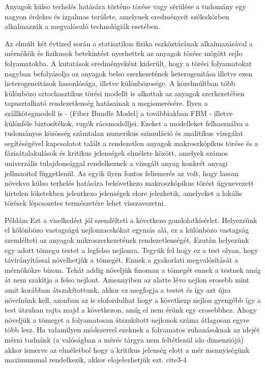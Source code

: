 Anyagok külso terhelés hatására történo törése vagy sérülése a tudomány egy nagyon érdekes és izgalmas
területe, amelynek eredményeit széleskörben alkalmazzák a megvalósuló technológiák esetében.

Az elmúlt két évtized során a statisztikus fizika eszköztárának alkalmazásával a mérnökök és fizikusok
betekintést nyerhettek az anyagok törése mögött rejlo folyamatokba. A kutatások eredményeként kiderült,
hogy a törési folyamatokat nagyban befolyásolja az anyagok belso szerkezetének heterogenitása illetve
ezen heterogeneitások hasonlósága, illetve különbözosége.
A közelmúltban több különbözo sztochasztikus törési modellt is alkottak az anyagok szerkezetében tapasztalható
rendezetlenség hatásainak a megismerésére. Ilyen a szállkötegmodell is - (Fiber Bundle Model) a továbbiakban FBM -
illetve különféle biztosítékok, rugók rácsmodelljei.
Ezeket a modelleket felhasználva a tudományos közösség számtalan numerikus szimuláció és analitikus
vizsgálat segítéségével kapcsolatot talált a rendezetlen anyagok makroszkópikus törése és a fázisátalakulások
és kritikus jelenségek elmélete között, amelyek számos univerzális tulajdonsággal rendelkeznek a vizsgált
anyag konkrét anyagi jellmzoitol függetlenül. Az egyik ilyen fontos felismerés az volt, hogy lassan növekvo
külso terhelés hatására bekövetkezo makroszkópikus törést úgynevezett hirtelen löketekben jelentkezo jelenségek
elore jelezhetik, amelyeket a lokális törések lépcsozetes természetére lehet visszavezetni. 

Példám
Ezt a viselkedést
jól szemlélteti a következo gondolatkísérlet. Helyezzünk el kölönbözo vastagságú nejlonzacskókat egymás
alá, ez a különbözo vastagság szemlélteti az anyagok mikroszerkezetének rendezetlenségét. Ezután helyezünk egy adott
tömegu testet a legfelso nejlonra. Tegyük fel hogy ez a test olyan, hogy távirányítással növelhetjük a tömegét.
Ennek a gyakorlati megvalósítását a mérnökökre bízom. Tehát addig növeljük finoman a tömegét ennek a testnek amíg át nem 
szakítja a felso nejlont. Amennyiben az alatte lévo nejlon erosebb mint amit korábban átszakítottunk, akkor ez megfogja
a testet és így azt újra növelnünk kell, azonban az is elofordulhat hogy a következp nejlon gyengébb így a test átzuhan rajta
majd a következon, amíg el nem érünk egy erosebbhez. Ahogy növeljük a tömeget a folyamatosan átszakított nejlonok száma
átlagosan egyre több lesz. Ha valamilyen módszerrel ezeknek a folyamatos zuhanásoknak az idejét mérni tudnánk
(a valóságban a mérés tárgya nem feltétlenül ido dimenziójú) akkor ismerve az elméletbol hogy a kritikus jelenség elott
a mér mennyiségünk maximummal rendelkezik, akkor elojelezhetjük ezt. cite{3-4}

